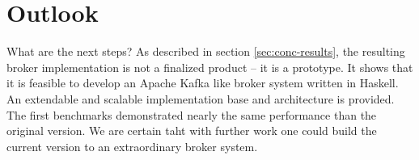 

\section{Outlook}

What are the next steps? As described in section \ref{sec:conc-results}, the
resulting broker implementation is not a finalized product -- it is a prototype.
It shows that it is feasible to develop an Apache Kafka like broker system
written in Haskell. An extendable and scalable implementation base and
architecture is provided.  The first benchmarks demonstrated nearly the same
performance than the original version. We are certain taht with further work one
could build the current version to an extraordinary broker system.

